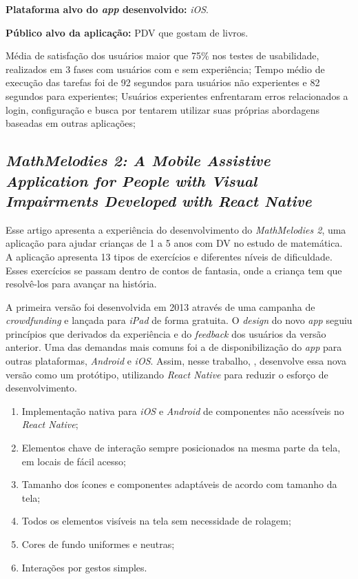 \textbf{Plataforma alvo do \emph{app} desenvolvido:} \emph{iOS}.

\textbf{Público alvo da aplicação:} PDV que gostam de livros\@.

Média de satisfação dos usuários maior que 75\% nos testes de usabilidade, realizados em 3 fases com usuários com e sem experiência;
Tempo médio de execução das tarefas foi de 92 segundos para usuários não experientes e 82 segundos para experientes;
Usuários experientes enfrentaram erros relacionados a login, configuração e busca por tentarem utilizar suas próprias abordagens baseadas em outras aplicações;

\subsection{\emph{MathMelodies 2: A Mobile Assistive Application for People with Visual Impairments Developed with React Native}}

Esse artigo apresenta a experiência do desenvolvimento do \emph{MathMelodies 2}, uma aplicação para ajudar crianças de 1 a 5 anos com DV no estudo de matemática.
A aplicação apresenta 13 tipos de exercícios e diferentes níveis de dificuldade.
Esses exercícios se passam dentro de contos de fantasia, onde a criança tem que resolvê-los para avançar na história.

A primeira versão foi desenvolvida em 2013 através de uma campanha de \emph{crowdfunding} e lançada para \emph{iPad} de forma gratuita.
O \emph{design} do novo \emph{app} seguiu princípios que derivados da experiência e do \emph{feedback} dos usuários da versão anterior.
Uma das demandas mais comuns foi a de disponibilização do \emph{app} para outras plataformas, \emph{Android} e \emph{iOS}.
Assim, nesse trabalho, , desenvolve essa nova versão como um protótipo, utilizando \emph{React Native} para reduzir o esforço de desenvolvimento.

\begin{enumerate}
\item Implementação nativa para \emph{iOS} e \emph{Android} de componentes não acessíveis no \emph{React Native};
\item Elementos chave de interação sempre posicionados na mesma parte da tela, em locais de fácil acesso;
\item Tamanho dos ícones e componentes adaptáveis de acordo com tamanho da tela;
\item Todos os elementos visíveis na tela sem necessidade de rolagem;
\item Cores de fundo uniformes e neutras;
\item Interações por gestos simples.
\end{enumerate}


